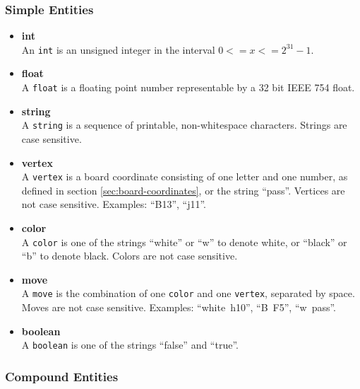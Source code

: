 \documentclass[a4paper]{article}
\begin{document}
\subsubsection{Simple Entities}
\label{sec:simple-entities}
\begin{itemize}
\item \textbf{int} \\
  An \texttt{int} is an unsigned integer in the interval $0 <= x <=
  2^{31} - 1$.

\item \textbf{float} \\
  A \texttt{float} is a floating point number representable by a 32
  bit IEEE 754 float.

\item \textbf{string} \\
  A \texttt{string} is a sequence of printable, non-whitespace
  characters. Strings are case sensitive.
  
\item \textbf{vertex} \\
  A \texttt{vertex} is a board coordinate consisting of one letter and
  one number, as defined in section \ref{sec:board-coordinates}, or
  the string ``pass''. Vertices are not case sensitive.  Examples:
  ``B13'', ``j11''.
  
\item \textbf{color} \\
  A \texttt{color} is one of the strings ``white'' or ``w'' to denote
  white, or ``black'' or ``b'' to denote black. Colors are not case
  sensitive.
  
\item \textbf{move} \\
  A \texttt{move} is the combination of one \texttt{color} and one
  \texttt{vertex}, separated by space. Moves are not case sensitive.
  Examples: ``white~h10'', ``B~F5'', ``w~pass''.

\item \textbf{boolean} \\
  A \texttt{boolean} is one of the strings ``false'' and ``true''.
\end{itemize}

\subsubsection{Compound Entities}
\label{sec:compound-entities}
\end{document}
